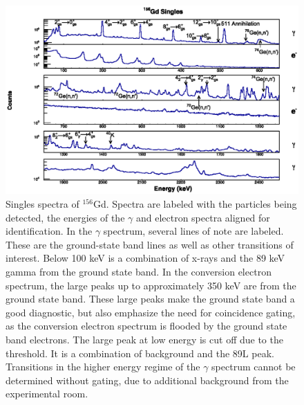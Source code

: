 \begin{figure}[!]
    \centering
    \includegraphics[scale=0.9]{156GdTablesAndFigs/156Gd_Singles_Label.eps}
    \caption[Singles spectra of $^{156}$Gd]{Singles spectra of $^{156}$Gd. Spectra are labeled with the particles being detected, the energies of the $\gamma$ and electron spectra aligned for identification. In the $\gamma$ spectrum, several lines of note are labeled. These are the ground-state band lines as well as other transitions of interest. Below 100 keV is a combination of x-rays and the 89 keV gamma from the ground state band. In the conversion electron spectrum, the large peaks up to approximately 350 keV are from the ground state band. These large peaks make the ground state band a good diagnostic, but also emphasize the need for coincidence gating, as the conversion electron spectrum is flooded by the ground state band electrons. The large peak at low energy is cut off due to the threshold. It is a combination of background and the 89L peak. Transitions in the higher energy regime of the $\gamma$ spectrum cannot be determined without gating, due to additional background from the experimental room.}
    \label{fig:156_Singles}
\end{figure}